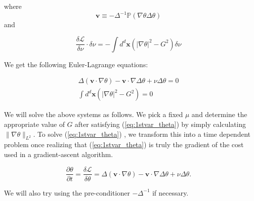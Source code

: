 \documentclass[12pt]{article}
\begin{document}
where 
\begin{equation}
\mathbf{v}\equiv - \Delta^{-1} \mathds{P}(\nabla\theta \Delta \theta)
\end{equation}
and 

\begin{equation}
\frac{\delta \mathcal{L} }{\delta \nu}\cdot \delta \nu = - \int d^{d}\mathbf{x} \left(|\nabla \theta|^{2} - G^{2}\right)\delta \nu
\end{equation}

We get the following Euler-Lagrange equations:

\begin{subequations}
\begin{align}
\label{eq:1stvar_theta} \Delta (\mathbf{v}\cdot \nabla \theta) -  \mathbf{v}\cdot\nabla\Delta\theta +\nu \Delta \theta = 0 \\
\int d^{d}\mathbf{x} \left(|\nabla \theta|^{2} - G^{2}\right) = 0
\end{align}
\end{subequations} 

We will solve the above systems as follows. We pick a fixed $\mu$ and determine the appropriate value of $G$ after satisfying (\ref{eq:1stvar_theta}) by simply calculating $\|\nabla \theta\|_{L^{2}}$.  To solve  (\ref{eq:1stvar_theta}) , we transform this into a time dependent problem once realizing that (\ref{eq:1stvar_theta}) is truly the gradient of the cost used in a gradient-ascent algorithm.

\begin{equation}
\frac{\partial \theta}{\partial t} =\frac{\delta \mathcal{L}}{\delta \theta} = \Delta (\mathbf{v}\cdot \nabla \theta) -  \mathbf{v}\cdot\nabla\Delta\theta +\nu \Delta \theta.
\end{equation}

We will also try using the pre-conditioner $-\Delta^{-1}$ if necessary.
\end{document}
